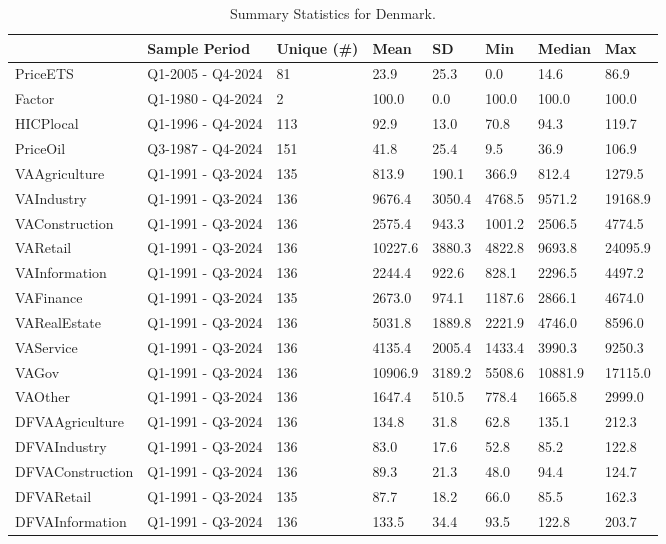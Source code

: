\begin{longtable}[t]{llllllll}
\caption{Summary Statistics for Denmark.}\\
\toprule
  & Sample Period & Unique (\#) & Mean & SD & Min & Median & Max\\
\midrule
PriceETS & Q1-2005 - Q4-2024 & 81 & 23.9 & 25.3 & 0.0 & 14.6 & 86.9\\
Factor & Q1-1980 - Q4-2024 & 2 & 100.0 & 0.0 & 100.0 & 100.0 & 100.0\\
HICPlocal & Q1-1996 - Q4-2024 & 113 & 92.9 & 13.0 & 70.8 & 94.3 & 119.7\\
PriceOil & Q3-1987 - Q4-2024 & 151 & 41.8 & 25.4 & 9.5 & 36.9 & 106.9\\
VAAgriculture & Q1-1991 - Q3-2024 & 135 & 813.9 & 190.1 & 366.9 & 812.4 & 1279.5\\
\addlinespace
VAIndustry & Q1-1991 - Q3-2024 & 136 & 9676.4 & 3050.4 & 4768.5 & 9571.2 & 19168.9\\
VAConstruction & Q1-1991 - Q3-2024 & 136 & 2575.4 & 943.3 & 1001.2 & 2506.5 & 4774.5\\
VARetail & Q1-1991 - Q3-2024 & 136 & 10227.6 & 3880.3 & 4822.8 & 9693.8 & 24095.9\\
VAInformation & Q1-1991 - Q3-2024 & 136 & 2244.4 & 922.6 & 828.1 & 2296.5 & 4497.2\\
VAFinance & Q1-1991 - Q3-2024 & 135 & 2673.0 & 974.1 & 1187.6 & 2866.1 & 4674.0\\
\addlinespace
VARealEstate & Q1-1991 - Q3-2024 & 136 & 5031.8 & 1889.8 & 2221.9 & 4746.0 & 8596.0\\
VAService & Q1-1991 - Q3-2024 & 136 & 4135.4 & 2005.4 & 1433.4 & 3990.3 & 9250.3\\
VAGov & Q1-1991 - Q3-2024 & 136 & 10906.9 & 3189.2 & 5508.6 & 10881.9 & 17115.0\\
VAOther & Q1-1991 - Q3-2024 & 136 & 1647.4 & 510.5 & 778.4 & 1665.8 & 2999.0\\
DFVAAgriculture & Q1-1991 - Q3-2024 & 136 & 134.8 & 31.8 & 62.8 & 135.1 & 212.3\\
\addlinespace
DFVAIndustry & Q1-1991 - Q3-2024 & 136 & 83.0 & 17.6 & 52.8 & 85.2 & 122.8\\
DFVAConstruction & Q1-1991 - Q3-2024 & 136 & 89.3 & 21.3 & 48.0 & 94.4 & 124.7\\
DFVARetail & Q1-1991 - Q3-2024 & 135 & 87.7 & 18.2 & 66.0 & 85.5 & 162.3\\
DFVAInformation & Q1-1991 - Q3-2024 & 136 & 133.5 & 34.4 & 93.5 & 122.8 & 203.7\\

\end{longtable}
